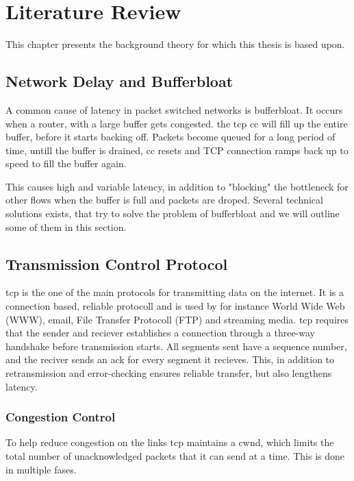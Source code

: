 \chapter{Literature Review}

This chapter presents the background theory for which this thesis is based upon.


\section{Network Delay and Bufferbloat}

A common cause of latency in packet switched networks is bufferbloat. It occurs when a router, with a large buffer gets congested. the tcp \gls{cc} will fill up the entire buffer, before it starts backing off. Packets become queued for a long period of time, untill the buffer is drained, \gls{cc} resets and TCP connection ramps back up to speed to fill the buffer again.

This causes high and variable latency, in addition to "blocking" the bottleneck for other flows when the buffer is full and packets are droped. Several technical solutions exists, that try to solve the problem of bufferbloat and we will outline some of them  in this section.

\section{Transmission Control Protocol}

\gls{tcp} is the one of the main protocols for transmitting data on the internet. It is a connection based, reliable protocoll and is used by for instance World Wide Web (WWW), email, File Transfer Protocoll (FTP) and streaming media. \gls{tcp} requires that the sender and reciever establishes a connection through a three-way handshake before transmission starts. All segments sent have a sequence number, and the reciver sends an \gls{ack} for every segment it recieves. This, in addition to retransmission and error-checking ensures reliable transfer, but also lengthens latency.

\subsection{Congestion Control}

To help reduce congestion on the links \gls{tcp} maintains a \gls{cwnd}, which limits the total number of unacknowledged packets that it can send at a time. This is  done in multiple fases.

